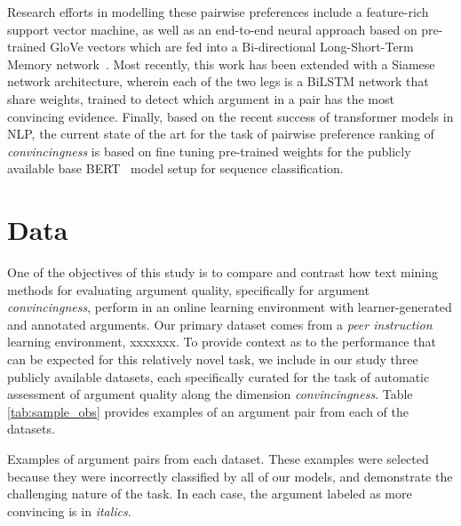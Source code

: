 \documentclass[runningheads]{llncs}
\begin{document}
Research efforts in modelling these pairwise preferences include a feature-rich 
support vector machine, as well as an end-to-end neural approach based on 
pre-trained GloVe vectors\cite{pennington_glove:_2014} which are fed into 
a Bi-directional Long-Short-Term Memory network~\cite{habernal_which_2016}. 
Most recently, this work has been extended with a Siamese network architecture, 
wherein each of the two legs is a BiLSTM network that share weights, 
trained to detect which argument in a pair has the most convincing 
evidence\cite{gleize_are_2019}.
Finally, based on the recent success of transformer models in NLP, the current 
state of the art for the task of pairwise preference ranking of 
\textit{convincingness} is based on fine tuning pre-trained weights for the 
publicly available base BERT~\cite{devlin_bert_2018} model setup for sequence 
classification\cite{toledo_automatic_2019}.


\section{Data}

One of the objectives of this study is to compare and contrast how text 
mining methods for evaluating argument quality, specifically for argument 
\textit{convincingness}, perform in an online learning environment with 
learner-generated and annotated arguments. 
Our primary dataset comes from a \textit{peer instruction} learning 
environment, xxxxxxx.
To provide context as to the performance that can be expected for this 
relatively novel task, we include in our study three publicly available 
datasets, each specifically curated for the task of automatic assessment of 
argument quality along the dimension \textit{convincingness}. 
Table \ref{tab:sample_obs} provides examples of an argument pair 
from each of the datasets.


\begin{table}
	\caption{Examples of argument pairs from each dataset. These examples were 
	selected because they were incorrectly classified by all of our models, and 
	demonstrate the challenging nature of the task. In each case, the argument 
	labeled as more convincing is in \textit{italics}.}
	\label{tab:sample_obs}
	\begin{subtable}[t]{\textwidth}
	
	\end{subtable}
	\begin{subtable}[t]{\textwidth}
	
	\end{subtable}
	\begin{subtable}[t]{\textwidth}
	
	\end{subtable}
\end{table}
\end{document}
